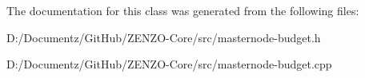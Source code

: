 The documentation for this class was generated from the following files\+:\begin{DoxyCompactItemize}
\item 
D\+:/\+Documentz/\+Git\+Hub/\+Z\+E\+N\+Z\+O-\/\+Core/src/masternode-\/budget.\+h\item 
D\+:/\+Documentz/\+Git\+Hub/\+Z\+E\+N\+Z\+O-\/\+Core/src/masternode-\/budget.\+cpp\end{DoxyCompactItemize}
